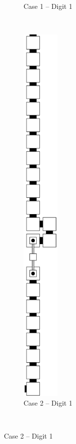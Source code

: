 \begin{enumerate}[label={--}]
\begin{figure}[h]
\begin{subfigure}[t]{0.2\textwidth}
                        \caption{\label{fig:warping/post_warp_case1_digit1_msr} Case 1 -- Digit 1}
                    \end{subfigure}%
                    ~
                    \begin{subfigure}[t]{0.2\textwidth}
                        \centering
                        \includegraphics[width=0.2\textwidth]{warping/post_warp_case2_digit1_msr}
                        \caption{\label{fig:warping/post_warp_case2_digit1_msr} Case 2 -- Digit 1}
                    \end{subfigure}%
                    ~


\end{figure}
\end{enumerate}
